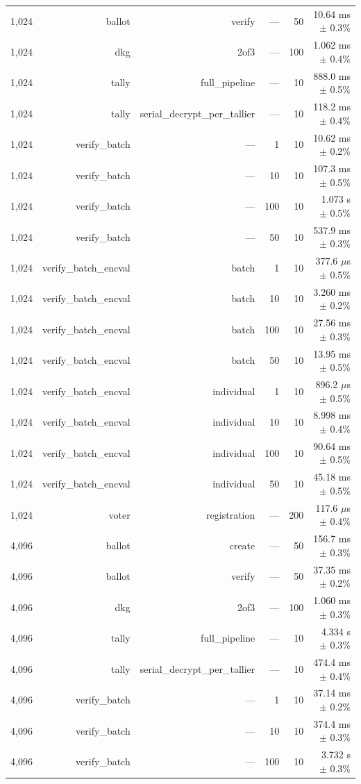 \begin{table}[h]
\begin{tabular}{lrrrrr}
1,024 & ballot & verify & — & 50 & 10.64 ms $\pm$ 0.3\% \\
1,024 & dkg & 2of3 & — & 100 & 1.062 ms $\pm$ 0.4\% \\
1,024 & tally & full\_pipeline & — & 10 & 888.0 ms $\pm$ 0.5\% \\
1,024 & tally & serial\_decrypt\_per\_tallier & — & 10 & 118.2 ms $\pm$ 0.4\% \\
1,024 & verify\_batch & — & 1 & 10 & 10.62 ms $\pm$ 0.2\% \\
1,024 & verify\_batch & — & 10 & 10 & 107.3 ms $\pm$ 0.5\% \\
1,024 & verify\_batch & — & 100 & 10 & 1.073 s $\pm$ 0.5\% \\
1,024 & verify\_batch & — & 50 & 10 & 537.9 ms $\pm$ 0.3\% \\
1,024 & verify\_batch\_encval & batch & 1 & 10 & 377.6 $\mu$s $\pm$ 0.5\% \\
1,024 & verify\_batch\_encval & batch & 10 & 10 & 3.260 ms $\pm$ 0.2\% \\
1,024 & verify\_batch\_encval & batch & 100 & 10 & 27.56 ms $\pm$ 0.3\% \\
1,024 & verify\_batch\_encval & batch & 50 & 10 & 13.95 ms $\pm$ 0.5\% \\
1,024 & verify\_batch\_encval & individual & 1 & 10 & 896.2 $\mu$s $\pm$ 0.5\% \\
1,024 & verify\_batch\_encval & individual & 10 & 10 & 8.998 ms $\pm$ 0.4\% \\
1,024 & verify\_batch\_encval & individual & 100 & 10 & 90.64 ms $\pm$ 0.5\% \\
1,024 & verify\_batch\_encval & individual & 50 & 10 & 45.18 ms $\pm$ 0.5\% \\
1,024 & voter & registration & — & 200 & 117.6 $\mu$s $\pm$ 0.4\% \\
4,096 & ballot & create & — & 50 & 156.7 ms $\pm$ 0.3\% \\
4,096 & ballot & verify & — & 50 & 37.35 ms $\pm$ 0.2\% \\
4,096 & dkg & 2of3 & — & 100 & 1.060 ms $\pm$ 0.3\% \\
4,096 & tally & full\_pipeline & — & 10 & 4.334 s $\pm$ 0.3\% \\
4,096 & tally & serial\_decrypt\_per\_tallier & — & 10 & 474.4 ms $\pm$ 0.4\% \\
4,096 & verify\_batch & — & 1 & 10 & 37.14 ms $\pm$ 0.2\% \\
4,096 & verify\_batch & — & 10 & 10 & 374.4 ms $\pm$ 0.3\% \\
4,096 & verify\_batch & — & 100 & 10 & 3.732 s $\pm$ 0.3\% \\

\end{tabular}
\end{table}
